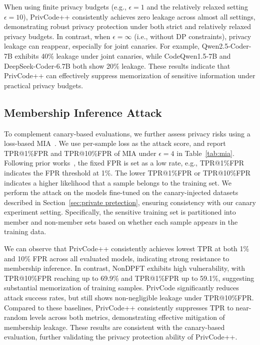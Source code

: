 \documentclass{article}
\theoremstyle{plain}
\theoremstyle{definition}
\theoremstyle{remark}
\def \toolname{PrivCode++}
\begin{document}
{When using finite privacy budgets (e.g., $\epsilon=1$ and the relatively relaxed setting $\epsilon=10$), \toolname{} consistently achieves zero leakage across almost all settings, demonstrating robust privacy protection under both strict and relatively relaxed privacy budgets. In contrast, when $\epsilon=\infty$ (i.e., without DP constraints), privacy leakage can reappear, especially for joint canaries. For example, Qwen2.5-Coder-7B exhibits 40\% leakage under joint canaries, while CodeQwen1.5-7B and DeepSeek-Coder-6.7B both show 20\% leakage. These results indicate that \toolname{} can effectively suppress memorization of sensitive information under practical privacy budgets.





\subsection{Membership Inference Attack}
\label{app:mia}



To complement canary-based evaluations, we further assess privacy risks using a loss-based MIA~\cite{shokri2017membership}. We use per-sample loss as the attack score, and report TPR@1\%FPR and TPR@10\%FPR of MIA under $\epsilon=4$ in Table~\ref{tab:mia}. Following prior works~\cite{li2024privimage, gong2025privorl}, the fixed FPR is set as a low rate, e.g., TPR@1\%FPR indicates the FPR threshold at 1\%. The lower TPR@1\%FPR or TPR@10\%FPR indicates a higher likelihood that a sample belongs to the training set. We perform the attack on the models fine-tuned on the canary-injected datasets described in Section~\ref{sec:private pretection}, ensuring consistency with our canary experiment setting. Specifically, the sensitive training set is partitioned into member and non-member sets based on whether each sample appears in the training data. 

We can observe that \toolname{} consistently achieves lowest TPR at both 1\% and 10\% FPR across all evaluated models, indicating strong resistance to membership inference. In contrast, NonDPFT exhibits high vulnerability, with TPR@10\%FPR reaching up to 69.9\% and TPR@1\%FPR up to 59.1\%, suggesting substantial memorization of training samples. PrivCode significantly reduces attack success rates, but still shows non-negligible leakage under TPR@10\%FPR. Compared to these baselines, \toolname{} consistently suppresses TPR to near-random levels across both metrics, demonstrating effective mitigation of membership leakage. These results are consistent with the canary-based evaluation, further validating the privacy protection ability of \toolname.






























}
\end{document}
